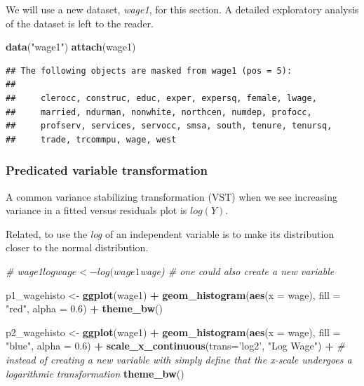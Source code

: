\documentclass[]{book}
\newenvironment{Shaded}{\begin{snugshade}}{\end{snugshade}}
\newcommand{\CommentTok}[1]{\textcolor[rgb]{0.56,0.35,0.01}{\textit{#1}}}
\newcommand{\DataTypeTok}[1]{\textcolor[rgb]{0.13,0.29,0.53}{#1}}
\newcommand{\FloatTok}[1]{\textcolor[rgb]{0.00,0.00,0.81}{#1}}
\newcommand{\KeywordTok}[1]{\textcolor[rgb]{0.13,0.29,0.53}{\textbf{#1}}}
\newcommand{\NormalTok}[1]{#1}
\newcommand{\OperatorTok}[1]{\textcolor[rgb]{0.81,0.36,0.00}{\textbf{#1}}}
\newcommand{\StringTok}[1]{\textcolor[rgb]{0.31,0.60,0.02}{#1}}
\begin{document}
We will use a new dataset, \emph{wage1}, for this section. A detailed
exploratory analysis of the dataset is left to the reader.

\begin{Shaded}
\begin{Highlighting}[]
\KeywordTok{data}\NormalTok{(}\StringTok{"wage1"}\NormalTok{)}
\KeywordTok{attach}\NormalTok{(wage1)}
\end{Highlighting}
\end{Shaded}

\begin{verbatim}
## The following objects are masked from wage1 (pos = 5):
## 
##     clerocc, construc, educ, exper, expersq, female, lwage,
##     married, ndurman, nonwhite, northcen, numdep, profocc,
##     profserv, services, servocc, smsa, south, tenure, tenursq,
##     trade, trcommpu, wage, west
\end{verbatim}

\hypertarget{predicated-variable-transformation}{%
\subsubsection{Predicated variable
transformation}\label{predicated-variable-transformation}}

A common variance stabilizing transformation (VST) when we see
increasing variance in a fitted versus residuals plot is \(log(Y)\).

Related, to use the \emph{log} of an independent variable is to make its
distribution closer to the normal distribution.

\begin{Shaded}
\begin{Highlighting}[]
\CommentTok{# wage1$logwage <- log(wage1$wage) # one could also create a new variable }

\NormalTok{p1_wagehisto <-}\StringTok{ }\KeywordTok{ggplot}\NormalTok{(wage1)  }\OperatorTok{+}
\StringTok{  }\KeywordTok{geom_histogram}\NormalTok{(}\KeywordTok{aes}\NormalTok{(}\DataTypeTok{x =}\NormalTok{ wage), }\DataTypeTok{fill =} \StringTok{"red"}\NormalTok{, }\DataTypeTok{alpha =} \FloatTok{0.6}\NormalTok{) }\OperatorTok{+}
\StringTok{  }\KeywordTok{theme_bw}\NormalTok{()}


\NormalTok{p2_wagehisto <-}\StringTok{ }\KeywordTok{ggplot}\NormalTok{(wage1)  }\OperatorTok{+}
\StringTok{  }\KeywordTok{geom_histogram}\NormalTok{(}\KeywordTok{aes}\NormalTok{(}\DataTypeTok{x =}\NormalTok{ wage),  }\DataTypeTok{fill =} \StringTok{"blue"}\NormalTok{, }\DataTypeTok{alpha =} \FloatTok{0.6}\NormalTok{) }\OperatorTok{+}
\StringTok{  }\KeywordTok{scale_x_continuous}\NormalTok{(}\DataTypeTok{trans=}\StringTok{'log2'}\NormalTok{, }\StringTok{"Log Wage"}\NormalTok{) }\OperatorTok{+}\StringTok{ }\CommentTok{# instead of creating a new variable with simply define that the x-scale undergoes a logarithmic transformation}
\StringTok{  }\KeywordTok{theme_bw}\NormalTok{()}
\end{Highlighting}
\end{Shaded}
\end{document}
